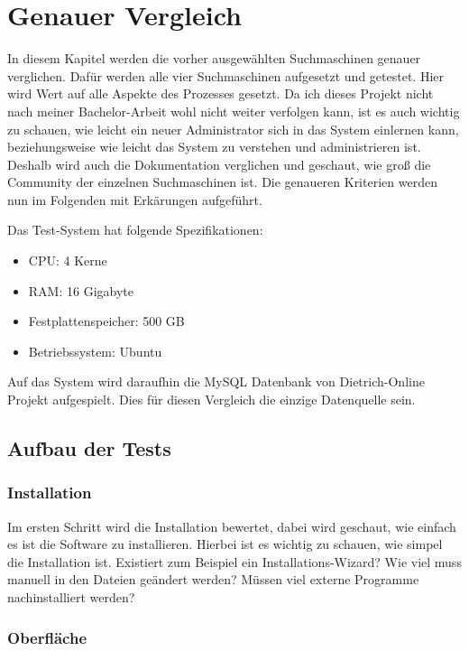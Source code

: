 \chapter{Genauer Vergleich}

In diesem Kapitel werden die vorher ausgewählten Suchmaschinen genauer verglichen. Dafür werden alle vier Suchmaschinen aufgesetzt und getestet. Hier wird Wert auf alle Aspekte des Prozesses gesetzt. Da ich dieses Projekt nicht nach meiner Bachelor-Arbeit wohl nicht weiter verfolgen kann, ist es auch wichtig zu schauen, wie leicht ein neuer Administrator sich in das System einlernen kann, beziehungsweise wie leicht das System zu verstehen und administrieren ist. Deshalb wird auch die Dokumentation verglichen und geschaut, wie groß die Community der einzelnen Suchmaschinen ist. Die genaueren Kriterien werden nun im Folgenden mit Erkärungen aufgeführt.

Das Test-System hat folgende Spezifikationen:

\begin{itemize}
    \item CPU: 4 Kerne
    \item RAM: 16 Gigabyte
    \item Festplattenspeicher: 500 GB
    \item Betriebssystem: Ubuntu
\end{itemize} 

Auf das System wird daraufhin die MySQL Datenbank von Dietrich-Online Projekt aufgespielt. Dies für diesen Vergleich die einzige Datenquelle sein.

\section{Aufbau der Tests}

\subsection{Installation}

Im ersten Schritt wird die Installation bewertet, dabei wird geschaut, wie einfach es ist die Software zu installieren. Hierbei ist es wichtig zu schauen, wie simpel die Installation ist. Existiert zum Beispiel ein Installations-Wizard? Wie viel muss manuell in den Dateien geändert werden? Müssen viel externe Programme nachinstalliert werden?

\subsection{Oberfläche}

